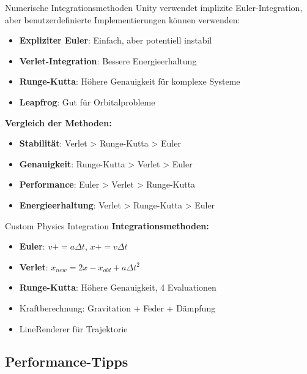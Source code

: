 \begin{concept}{Numerische Integrationsmethoden}
    Unity verwendet implizite Euler-Integration, aber benutzerdefinierte Implementierungen können verwenden:
    \begin{itemize}
        \item \textbf{Expliziter Euler}: Einfach, aber potentiell instabil
        \item \textbf{Verlet-Integration}: Bessere Energieerhaltung
        \item \textbf{Runge-Kutta}: Höhere Genauigkeit für komplexe Systeme
        \item \textbf{Leapfrog}: Gut für Orbitalprobleme
    \end{itemize}
    
    \textbf{Vergleich der Methoden:}
    \begin{itemize}
        \item \textbf{Stabilität}: Verlet > Runge-Kutta > Euler
        \item \textbf{Genauigkeit}: Runge-Kutta > Verlet > Euler
        \item \textbf{Performance}: Euler > Verlet > Runge-Kutta
        \item \textbf{Energieerhaltung}: Verlet > Runge-Kutta > Euler
    \end{itemize}
\end{concept}

\begin{concept}{Custom Physics Integration}
    \textbf{Integrationsmethoden:}
    \begin{itemize}
        \item \textbf{Euler}: $v += a \Delta t$, $x += v \Delta t$
        \item \textbf{Verlet}: $x_{new} = 2x - x_{old} + a \Delta t^2$
        \item \textbf{Runge-Kutta}: Höhere Genauigkeit, 4 Evaluationen
        \item Kraftberechnung: Gravitation + Feder + Dämpfung
        \item LineRenderer für Trajektorie
    \end{itemize}
\end{concept}

\subsection{Performance-Tipps}

